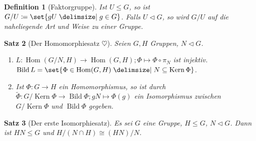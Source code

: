 \documentclass[a4paper]{article}
\newcounter{Sec}
\theoremstyle{marginbreak}
\newtheorem{definition}{Definition}[Sec]
\newtheorem{satz}[definition]{Satz}
\newcommand\nt\triangleleft
\DeclareMathOperator{\Hom}{Hom}
\DeclareMathOperator{\Kern}{Kern}
\DeclareMathOperator{\Bild}{Bild}
\begin{document}
\begin{definition}[Faktorgruppe]
	Ist $U\leq G$, so ist $G/U\coloneqq\set{gU\given g\in G}$. Falls $U\nt G$, so wird $G/U$
	auf die naheliegende Art und Weise zu einer Gruppe.
\end{definition}
\begin{satz}[Der Homomorphiesatz $\heartsuit$]
	Seien $G, H$ Gruppen, $N\nt G$.
	\begin{enumerate}[label=(\alph*)]
		\item
			$
				L\colon\Hom(G/N, H)\to\Hom(G, H); \Phi\mapsto \Phi\circ\pi_N
			$
			ist injektiv. $\Bild L=\set{\Phi\in\Hom(G, H)\given N\subseteq\Kern\Phi}$.
		\item Ist $\Phi\colon G\to H$ ein Homomorphismus, so ist durch
			$\tilde{\Phi}\colon G/\Kern\Phi\to \Bild\Phi; gN\mapsto \Phi(g)$ ein
			Isomorphismus zwischen $G/\Kern\Phi$ und $\Bild\Phi$ gegeben.
	\end{enumerate}
\end{satz}
\begin{satz}[Der erste Isomorphiesatz]
	Es sei $G$ eine Gruppe, $H\leq G$, $N\nt G$. Dann ist $HN\leq G$ und $H/(N\cap H)\cong (HN)/N$.
\end{satz}
\end{document}
